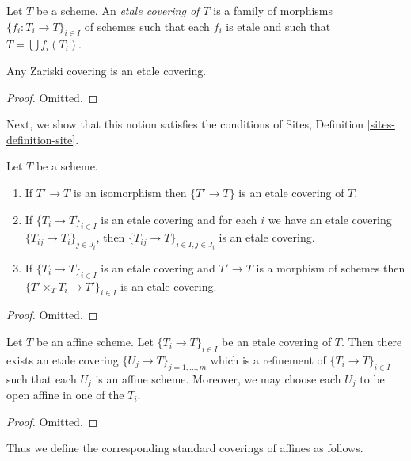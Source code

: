 \begin{definition}
\label{definition-etale-covering}
Let $T$ be a scheme. An {\it etale covering of $T$} is a family
of morphisms $\{f_i : T_i \to T\}_{i \in I}$ of schemes
such that each $f_i$ is etale and such that $T = \bigcup f_i(T_i)$.
\end{definition}

\begin{lemma}
\label{lemma-zariski-etale}
Any Zariski covering is an etale covering.
\end{lemma}

\begin{proof}
Omitted.
\end{proof}

\noindent
Next, we show that this notion satisfies the conditions of
Sites, Definition \ref{sites-definition-site}.

\begin{lemma}
\label{lemma-etale}
Let $T$ be a scheme.
\begin{enumerate}
\item If $T' \to T$ is an isomorphism then $\{T' \to T\}$
is an etale covering of $T$.
\item If $\{T_i \to T\}_{i\in I}$ is an etale covering and for each
$i$ we have an etale covering $\{T_{ij} \to T_i\}_{j\in J_i}$, then
$\{T_{ij} \to T\}_{i \in I, j\in J_i}$ is an etale covering.
\item If $\{T_i \to T\}_{i\in I}$ is an etale covering
and $T' \to T$ is a morphism of schemes then
$\{T' \times_T T_i \to T'\}_{i\in I}$ is an etale covering.
\end{enumerate}
\end{lemma}

\begin{proof}
Omitted.
\end{proof}

\begin{lemma}
\label{lemma-etale-affine}
Let $T$ be an affine scheme.
Let $\{T_i \to T\}_{i \in I}$ be an etale covering of $T$.
Then there exists an etale covering
$\{U_j \to T\}_{j = 1, \ldots, m}$ which is a refinement
of $\{T_i \to T\}_{i \in I}$ such that each $U_j$ is an affine
scheme. Moreover, we may choose each $U_j$ to be open affine
in one of the $T_i$.
\end{lemma}

\begin{proof}
Omitted.
\end{proof}

\noindent
Thus we define the corresponding standard coverings of affines as follows.

